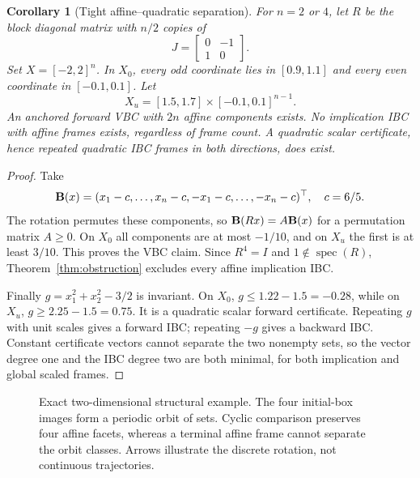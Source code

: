 \documentclass[5p,times]{elsarticle}
\newtheorem{corollary}[theorem]{Corollary}
\theoremstyle{definition}\newtheorem{definition}[theorem]{Definition}
\theoremstyle{remark}\newtheorem{remark}[theorem]{Remark}
\begin{document}
\begin{corollary}[Tight affine--quadratic separation]\label{cor:rotation}
For $n=2$ or $4$, let $R$ be the block diagonal matrix with $n/2$ copies of
\[
 J=\begin{bmatrix}0&-1\\1&0\end{bmatrix}.
\]
Set $X=[-2,2]^n$. In $X_0$, every odd coordinate lies in $[0.9,1.1]$ and every even coordinate in $[-0.1,0.1]$. Let
\[
 X_u=[1.5,1.7]\times[-0.1,0.1]^{n-1}.
\]
An anchored forward VBC with $2n$ affine components exists. No implication IBC with affine frames exists, regardless of frame count. A quadratic scalar certificate, hence repeated quadratic IBC frames in both directions, does exist.
\end{corollary}
\begin{proof}
Take
\begin{equation}\label{eq:facets}
 \mathbf B(x)=(x_1-c,\ldots,x_n-c,-x_1-c,\ldots,-x_n-c)^\top,
 \quad c=6/5.
\end{equation}
The rotation permutes these components, so $\mathbf B(Rx)=A\mathbf B(x)$ for a permutation matrix $A\ge0$. On $X_0$ all components are at most $-1/10$, and on $X_u$ the first is at least $3/10$. This proves the VBC claim. Since $R^4=I$ and $1\notin\operatorname{spec}(R)$, Theorem~\ref{thm:obstruction} excludes every affine implication IBC.

Finally $g=x_1^2+x_2^2-3/2$ is invariant. On $X_0$, $g\le1.22-1.5=-0.28$, while on $X_u$, $g\ge2.25-1.5=0.75$. It is a quadratic scalar forward certificate. Repeating $g$ with unit scales gives a forward IBC; repeating $-g$ gives a backward IBC. Constant certificate vectors cannot separate the two nonempty sets, so the vector degree one and the IBC degree two are both minimal, for both implication and global scaled frames.
\end{proof}

\begin{figure}[t]
\centering
{}
\caption{Exact two-dimensional structural example. The four initial-box images form a periodic orbit of sets. Cyclic comparison preserves four affine facets, whereas a terminal affine frame cannot separate the orbit classes. Arrows illustrate the discrete rotation, not continuous trajectories.}\label{fig:rotation}
\end{figure}
\end{document}
